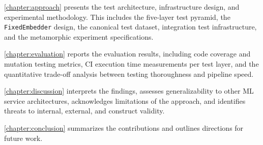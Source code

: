 \autoref{chapter:approach} presents the test architecture, infrastructure design, and experimental methodology. This includes the five-layer test pyramid, the \texttt{FixedEmbedder} design, the canonical test dataset, integration test infrastructure, and the metamorphic experiment specifications.

\autoref{chapter:evaluation} reports the evaluation results, including code coverage and mutation testing metrics, \ac{CI} execution time measurements per test layer, and the quantitative trade-off analysis between testing thoroughness and pipeline speed.

\autoref{chapter:discussion} interprets the findings, assesses generalizability to other \ac{ML} service architectures, acknowledges limitations of the approach, and identifies threats to internal, external, and construct validity.

\autoref{chapter:conclusion} summarizes the contributions and outlines directions for future work.
